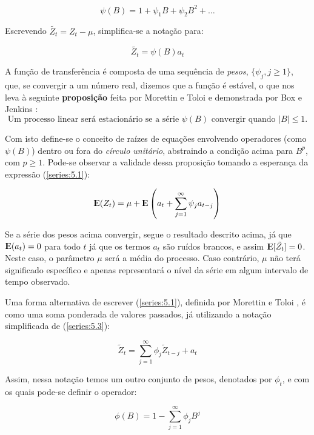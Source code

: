 \[ \psi(B) = 1 + \psi_1 B + \psi_2 B^2 + \ldots \]

Escrevendo $\tilde{Z_t} = Z_t - \mu$, simplifica-se a notação para:

\begin{equation}\label{series:5.3}
\tilde{Z_t} =  \psi(B)a_t 
\end{equation}

A função de transferência é composta de uma sequência de \emph{pesos}, $\{ \psi_j, j \geq 1 \}$, que, se convergir a um número real, dizemos que a função é estável, o que nos leva à seguinte \textbf{proposição} feita por Morettin e Toloi \citep{morettin} e demonstrada por Box e Jenkins \citep{box}:
\begin{equation}\label{prop:5.1}
\text{Um processo linear será estacionário se a série } \psi(B) \text{ convergir quando } |B| \leq 1.
\end{equation}

Com isto define-se o conceito de raízes de equações envolvendo operadores (como $\psi(B)$) dentro ou fora do \emph{círculo unitário}, abstraindo a condição acima para $B^p$, com $p \geq 1$. Pode-se observar a validade dessa proposição tomando a esperança da expressão (\ref{series:5.1}):

\[
{\rm I\kern-.3em E}(Z_t) = \mu + {\rm I\kern-.3em E} \left( a_t + \sum_{j=1}^\infty \psi_j a_{t-j} \right)
\]

Se a série dos pesos acima convergir, segue o resultado descrito acima, já que ${\rm I\kern-.3em E}(a_t) = 0$ para todo $t$ já que os termos $a_t$ são ruídos brancos, e assim ${\rm I\kern-.3em E}[\tilde{Z_t}] = 0$. Neste caso, o parâmetro $\mu$ será a média do processo. Caso contrário, $\mu$ não terá significado específico e apenas representará o nível da série em algum intervalo de tempo observado.

Uma forma alternativa de escrever (\ref{series:5.1}), definida por Morettin e Toloi \citep{morettin}, é como uma soma ponderada de valores passados, já utilizando a notação simplificada de (\ref{series:5.3}):

\begin{equation}\label{series:5.6}
\tilde{Z}_t = \sum_{j=1}^\infty \phi_j \tilde{Z}_{t-j} + a_t
\end{equation}

Assim, nessa notação temos um outro conjunto de pesos, denotados por $\phi_t$, e com os quais pode-se definir o operador:

\begin{equation}\label{series:5.8}
\phi(B) = 1 - \sum_{j=1}^\infty \phi_j B^j
\end{equation}


